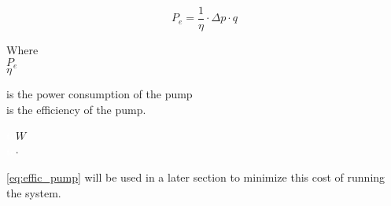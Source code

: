 \begin{equation}
P_e = \frac{1}{\eta}\cdot\Delta p \cdot q 
\label{eq:effic_pump}
\end{equation}

\begin{minipage}[t]{0.20\textwidth}
Where\\
\hspace*{8mm} $P_e$\\
\hspace*{8mm} $\eta$
\end{minipage}
\begin{minipage}[t]{0.68\textwidth}
\vspace*{2mm}
is the power consumption of the pump\\
is the efficiency of the pump.
\end{minipage}
\begin{minipage}[t]{0.10\textwidth}
\vspace*{2mm}
\textcolor{White}{te}$\unit{W}$\\
\textcolor{White}{te}$\unit{\cdot}$\\
\end{minipage}	

\eqref{eq:effic_pump} will be used in a later section to minimize this cost of running the system. 






